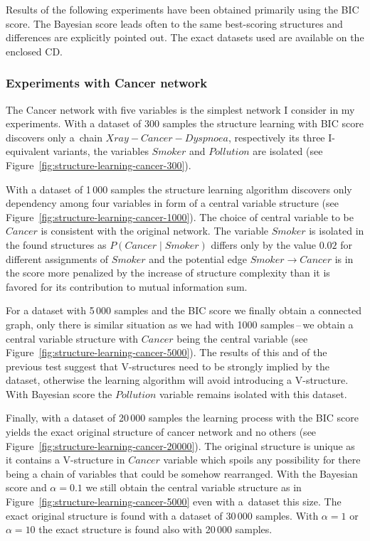 \documentclass[english,cover]{fitthesis} %
\newcommand{\todo}[1]{{\color{red}#1}}
\begin{document}
\todo{Results of the following experiments have been obtained primarily using the BIC score. The Bayesian score leads often to the same best-scoring structures and differences are explicitly pointed out. \todo{The exact datasets used are available on the enclosed CD}.}


\subsubsection{Experiments with Cancer network}
The Cancer network with five variables is the simplest network I consider in my experiments. With a dataset of 300 samples the structure learning with BIC score discovers only a~chain $Xray - Cancer - Dyspnoea$, respectively its three I-equivalent variants, the variables $Smoker$ and $Pollution$ are isolated (see Figure~\ref{fig:structure-learning-cancer-300}).

With a dataset of 1\,000 samples the structure learning algorithm discovers only dependency among four variables in form of a central variable structure (see Figure~\ref{fig:structure-learning-cancer-1000}). The choice of central variable to be $Cancer$ is consistent with the original network. The variable $Smoker$ is isolated in the found structures as $P(Cancer \mid Smoker)$ differs only by the value $0.02$ for different assignments of $Smoker$ and the potential edge $Smoker \rightarrow Cancer$ is in the score more penalized by the increase of structure complexity than it is favored for its contribution to mutual information sum.

For a dataset with 5\,000 samples and the BIC score we finally obtain a connected graph, only there is similar situation as we had with 1000 samples\,--\,we obtain a central variable structure with $Cancer$ being the central variable (see Figure~\ref{fig:structure-learning-cancer-5000}). The results of this and of the previous test suggest that V-structures need to be strongly implied by the dataset, otherwise the learning algorithm will avoid introducing a V-structure. With Bayesian score the $Pollution$ variable remains isolated with this dataset.

Finally, with a dataset of 20\,000 samples the learning process with the BIC score yields the exact original structure of cancer network and no others (see Figure~\ref{fig:structure-learning-cancer-20000}). The original structure is unique as it contains a V-structure in $Cancer$ variable which spoils any possibility for there being a chain of variables that could be somehow rearranged. With the Bayesian score and $\alpha=0.1$ we still obtain the central variable structure as in Figure~\ref{fig:structure-learning-cancer-5000} even with a~dataset this size. The exact original structure is found with a dataset of 30\,000 samples. With $\alpha = 1$ or $\alpha=10$ the exact structure is found also with 20\,000 samples.
\end{document}
